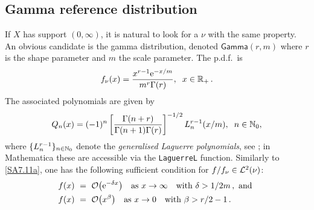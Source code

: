 \subsection{Gamma reference distribution}\label{SS:GammaNu}
If $X$ has support $(0,\infty)$, it is natural to look for a $\nu$ with the same property.
An obvious candidate is the
gamma distribution, denoted $\mathsf{Gamma}(r,m)$ where $r$ is the shape parameter
and $m$ the scale parameter.
The p.d.f.\ is
\begin{equation} \label{GammaPDF}
f_{\nu}(x)=\frac{x^{r-1} \mathrm{e}^{-x/m}}{m^{r}\Gamma(r)},\hspace{0.2cm}x\in \mathbb{R}_+ \,.
\end{equation}
The associated polynomials are given by
\begin{equation} \label{OrthogonalPolynomialGammaDistribution}
Q_{n}(x)=(-1)^{n}\left[\frac{\Gamma(n+r)}{\Gamma(n+1)\Gamma(r)}\right]^{-1/2}L_{n}^{r-1}(x/m),\hspace{0.2cm} n\in\mathbb{N}_0,
\end{equation}
where $\{L^{r-1}_{n}\}_{n\in\mathbb{N}_0}$ denote the \emph{generalised Laguerre polynomials}, see \cite{Sz39}; in Mathematica these are accessible via the \texttt{LaguerreL} function.
Similarly to \eqref{SA7.11a}, one has the following sufficient condition for $f/f_\nu\in\mathcal{L}^2(\nu)$:
\begin{gather}\begin{split}\label{SA7.11b}
f(x)\ &=\ {\mathcal{O}}\big(\mathrm{e}^{-\delta x}\big)\quad\text{as }x\to\infty\quad\text{with } \delta>1/2m\,, \text{ and }\\
f(x)\ &=\ {\mathcal{O}}\big(x^\beta\big)\quad\text{as }x\to 0\quad\text{with }\beta>r/2-1\,.
\end{split}\end{gather}

